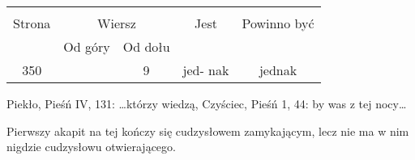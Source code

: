 \documentclass[a4paper,11pt]{article}
\begin{document}



\begin{center}

  \begin{tabular}{|c|c|c|c|c|}
    \hline
    & \multicolumn{2}{c|}{} & & \\
    Strona & \multicolumn{2}{c|}{Wiersz} & Jest
                              & Powinno być \\ \cline{2-3}
    & Od góry & Od dołu & & \\
    \hline
    350 & & 9 & jed- nak & jednak \\
    \hline
  \end{tabular}

\end{center}





Piekło, Pieśń IV, 131: \ldots którzy wiedzą, Czyściec, Pieśń 1, 44: by was
z tej nocy\ldots

\vspace{\spaceTwo}












\start {} Pierwszy akapit na tej kończy się cudzysłowem
zamykającym, lecz nie ma w nim nigdzie cudzysłowu otwierającego.

\vspace{\spaceFour}





\end{document}

